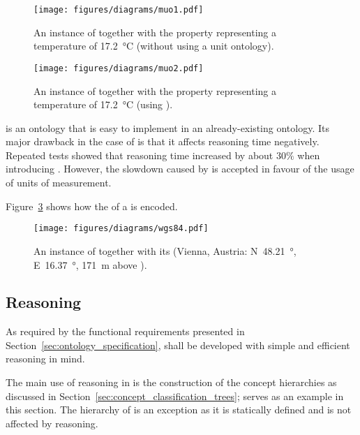 \begin{figure}
  \centering
  \texttt{[image: figures/diagrams/muo1.pdf]}
  \caption[An instance of  without units]{An instance of  together with the property  representing a temperature of \SI{17.2}{\celsius} (without using a unit ontology).}
  \label{fig:muo1}
\end{figure}

\begin{figure}
  \centering
  \texttt{[image: figures/diagrams/muo2.pdf]}
  \caption[An instance of  using \muo]{An instance of  together with the property  representing a temperature of \SI{17.2}{\celsius} (using \muo).}
  \label{fig:muo2}
\end{figure}

\muo is an ontology that is easy to implement in an already-existing ontology. Its major drawback in the case of \smarthomeweather is that it affects reasoning time negatively. Repeated tests showed that reasoning time increased by about $30 \%$ when introducing \muo. However, the slowdown caused by \muo is accepted in favour of the usage of units of measurement.

\vspace{1em}

Figure~\ref{fig:owl_wgs84} shows how the  of a  is encoded. %

\begin{figure}
  \centering
  \texttt{[image: figures/diagrams/wgs84.pdf]}
  \caption[An instance of  together with its ]{An instance of  together with its  (Vienna, Austria: N~\SI{48.21}{\degree}, E~\SI{16.37}{\degree}, \SI{171}{\metre} above ).}
  \label{fig:owl_wgs84}
\end{figure}

\subsection{Reasoning}
\label{sec:reasoning}

As required by the functional requirements presented in Section~\ref{sec:ontology_specification}, \smarthomeweather shall be developed with simple and efficient  reasoning in mind.

The main use of  reasoning in \smarthomeweather is the construction of the concept hierarchies as discussed in Section~\ref{sec:concept_classification_trees};  serves as an example in this section. The hierarchy of  is an exception as it is statically defined and is not affected by reasoning.

